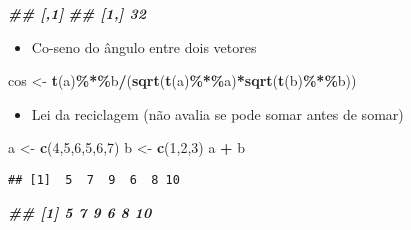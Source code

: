 \documentclass[
]{article}
\newenvironment{Shaded}{\begin{snugshade}}{\end{snugshade}}
\newcommand{\DecValTok}[1]{\textcolor[rgb]{0.00,0.00,0.81}{#1}}
\newcommand{\DocumentationTok}[1]{\textcolor[rgb]{0.56,0.35,0.01}{\textbf{\textit{#1}}}}
\newcommand{\FunctionTok}[1]{\textcolor[rgb]{0.13,0.29,0.53}{\textbf{#1}}}
\newcommand{\NormalTok}[1]{#1}
\newcommand{\OtherTok}[1]{\textcolor[rgb]{0.56,0.35,0.01}{#1}}
\newcommand{\SpecialCharTok}[1]{\textcolor[rgb]{0.81,0.36,0.00}{\textbf{#1}}}
\providecommand{\tightlist}{%
  \setlength{\itemsep}{0pt}\setlength{\parskip}{0pt}}
\begin{document}
\begin{Shaded}
\begin{Highlighting}[]
\DocumentationTok{\#\#    [,1]}
\DocumentationTok{\#\# [1,] 32}
\end{Highlighting}
\end{Shaded}

\begin{itemize}
\tightlist
\item
  Co-seno do ângulo entre dois vetores
\end{itemize}

\begin{Shaded}
\begin{Highlighting}[]
\NormalTok{cos }\OtherTok{\textless{}{-}} \FunctionTok{t}\NormalTok{(a)}\SpecialCharTok{\%*\%}\NormalTok{b}\SpecialCharTok{/}\NormalTok{(}\FunctionTok{sqrt}\NormalTok{(}\FunctionTok{t}\NormalTok{(a)}\SpecialCharTok{\%*\%}\NormalTok{a)}\SpecialCharTok{*}\FunctionTok{sqrt}\NormalTok{(}\FunctionTok{t}\NormalTok{(b)}\SpecialCharTok{\%*\%}\NormalTok{b))}
\end{Highlighting}
\end{Shaded}

\begin{itemize}
\tightlist
\item
  Lei da reciclagem (não avalia se pode somar antes de somar)
\end{itemize}

\begin{Shaded}
\begin{Highlighting}[]
\NormalTok{a }\OtherTok{\textless{}{-}} \FunctionTok{c}\NormalTok{(}\DecValTok{4}\NormalTok{,}\DecValTok{5}\NormalTok{,}\DecValTok{6}\NormalTok{,}\DecValTok{5}\NormalTok{,}\DecValTok{6}\NormalTok{,}\DecValTok{7}\NormalTok{)}
\NormalTok{b }\OtherTok{\textless{}{-}} \FunctionTok{c}\NormalTok{(}\DecValTok{1}\NormalTok{,}\DecValTok{2}\NormalTok{,}\DecValTok{3}\NormalTok{)}
\NormalTok{a }\SpecialCharTok{+}\NormalTok{ b}
\end{Highlighting}
\end{Shaded}

\begin{verbatim}
## [1]  5  7  9  6  8 10
\end{verbatim}

\begin{Shaded}
\begin{Highlighting}[]
\DocumentationTok{\#\# [1] 5 7 9 6 8 10}
\end{Highlighting}
\end{Shaded}
\end{document}

